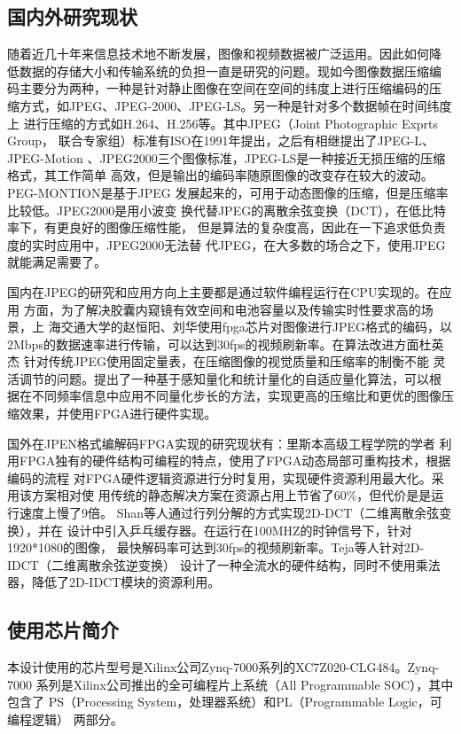 \documentclass{article}
\numberwithin {equation}{section}
\begin{document}
\begin{spacing}{1.25}
  \subsection{国内外研究现状}
    \vspace{1em}
    随着近几十年来信息技术地不断发展，图像和视频数据被广泛运用。因此如何降
    低数据的存储大小和传输系统的负担一直是研究的问题。现如今图像数据压缩编
    码主要分为两种，一种是针对静止图像在空间在空间的纬度上进行压缩编码的压
    缩方式，如JPEG、JPEG-2000、JPEG-LS。另一种是针对多个数据帧在时间纬度上
    进行压缩的方式如H.264、H.256等。其中JPEG（Joint Photographic Exprts Group，
    联合专家组）标准有ISO在1991年提出，之后有相继提出了JPEG-L、JPEG-Motion
    、JPEG2000三个图像标准，JPEG-LS是一种接近无损压缩的压缩格式，其工作简单
    高效，但是输出的编码率随原图像的改变存在较大的波动。PEG-MONTION是基于JPEG
    发展起来的，可用于动态图像的压缩，但是压缩率比较低。JPEG2000是用小波变
    换代替JPEG的离散余弦变换（DCT），在低比特率下，有更良好的图像压缩性能，
    但是算法的复杂度高，因此在一下追求低负责度的实时应用中，JPEG2000无法替
    代JPEG，在大多数的场合之下，使用JPEG就能满足需要了。

    国内在JPEG的研究和应用方向上主要都是通过软件编程运行在CPU实现的。在应用
    方面，为了解决胶囊内窥镜有效空间和电池容量以及传输实时性要求高的场景，上
    海交通大学的赵恒阳、刘华\cite{ref1}使用fpga芯片对图像进行JPEG格式的编码，以
    2Mbps的数据速率进行传输，可以达到30fps的视频刷新率。在算法改进方面杜英杰
    \cite{ref2}针对传统JPEG使用固定量表，在压缩图像的视觉质量和压缩率的制衡不能
    灵活调节的问题。提出了一种基于感知量化和统计量化的自适应量化算法，可以根
    据在不同频率信息中应用不同量化步长的方法，实现更高的压缩比和更优的图像压
    缩效果，并使用FPGA进行硬件实现。

    国外在JPEN格式编解码FPGA实现的研究现状有：里斯本高级工程学院的学者
    \cite{ref10}利用FPGA独有的硬件结构可编程的特点，使用了FPGA动态局部可重构技术，根据编码的流程
    对FPGA硬件逻辑资源进行分时复用，实现硬件资源利用最大化。采用该方案相对使
    用传统的静态解决方案在资源占用上节省了60\%，但代价是是运行速度上慢了9倍。
    Shan等人\cite{ref11}通过行列分解的方式实现2D-DCT（二维离散余弦变换），并在
    设计中引入乒乓缓存器。在运行在100MHZ的时钟信号下，针对1920*1080的图像，
    最快解码率可达到30fps的视频刷新率。Teja等人针对2D-IDCT（二维离散余弦逆变换）
    设计了一种全流水的硬件结构，同时不使用乘法器，降低了2D-IDCT模块的资源利用。
  \subsection{使用芯片简介}
    \vspace{1em}
    本设计使用的芯片型号是Xilinx公司Zynq-7000系列的XC7Z020-CLG484。Zynq-7000
    系列是Xilinx公司推出的全可编程片上系统（All Programmable SOC），其中包含了
    PS（Processing System，处理器系统）和PL（Programmable Logic，可编程逻辑）
    两部分。


\end{spacing}
\end{document}

